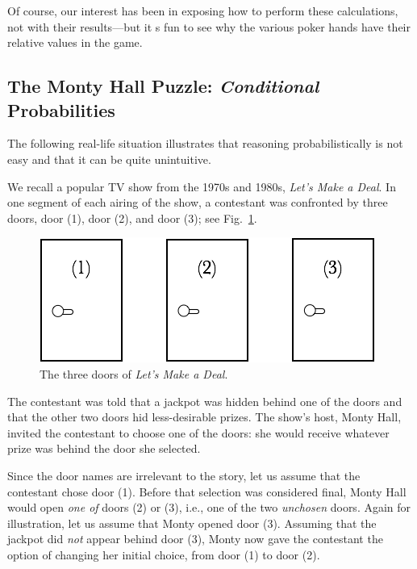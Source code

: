 Of course, our interest has been in exposing how to perform these calculations, not with their
results---but it s fun to see why the various poker hands have their relative values in the game.


\subsection{The Monty Hall Puzzle: {\em Conditional} Probabilities}
\label{sec:monty-hall}

The following real-life situation illustrates that reasoning probabilistically is not easy and that it can be quite unintuitive.

\bigskip


We recall a popular TV show from the 1970s and 1980s, \textit{Let's Make a Deal}.  In one segment of each airing of the show, a contestant was confronted by three doors, door (1), door (2), and door (3); see Fig.~\ref{fig:MonthyHal-1}.
\begin{figure}[htb]
\begin{center}
        \includegraphics[scale=0.4]{FiguresMaths/MonthyHallInitial}
        \caption{The three doors of \textit{Let's Make a Deal}.}
        \label{fig:MonthyHal-1}
\end{center}
\end{figure}
The contestant was told that a jackpot was hidden behind one of the doors and that the other two doors hid less-desirable prizes.  The show's host, Monty Hall, invited the contestant to choose one of the doors: she would receive whatever prize was behind the door she selected.

\smallskip

Since the door names are irrelevant to the story, let us assume that the contestant chose door (1).  Before that selection was considered final, Monty Hall would open {\em one of} doors (2) or (3), i.e., one of the two {\em unchosen} doors.  Again for illustration, let us assume that Monty opened door (3).  Assuming that the jackpot did {\em not} appear  behind door (3), Monty now gave the contestant the option of changing her initial choice, from door (1) to door (2).

